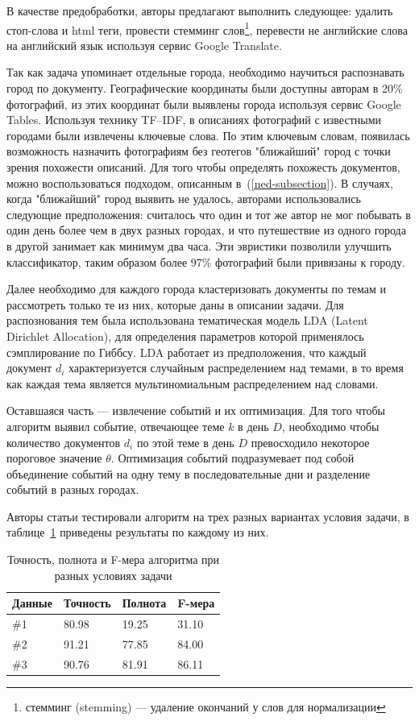 \documentclass[12pt, a4paper]{article}
\begin{document}
  В качестве предобработки, авторы предлагают выполнить следующее: удалить стоп-слова и html теги, провести стемминг слов\footnote{стемминг (stemming) --- удаление окончаний у слов для нормализации}, перевести не английские слова на английский язык используя сервис Google Translate.
  
	Так как задача упоминает отдельные города, необходимо научиться распознавать город по документу. Географические координаты были доступны авторам в 20\% фотографий, из этих координат были выявлены города используя сервис Google Tables. Используя технику TF--IDF, в описаниях фотографий с известными городами были извлечены ключевые слова. По этим ключевым словам, появилась возможность назначить фотографиям без геотегов "ближайший" город с точки зрения похожести описаний. Для того чтобы определять похожесть документов, можно воспользоваться подходом, описанным в~(\ref{ned-subsection}). В случаях, когда "ближайший" город выявить не удалось, авторами использовались следующие предположения: считалось что один и тот же автор не мог побывать в один день более чем в двух разных городах, и что путешествие из одного города в другой занимает как минимум два часа. Эти эвристики позволили улучшить классификатор, таким образом более 97\% фотографий были привязаны к городу.
	
	Далее необходимо для каждого города кластеризовать документы по темам и рассмотреть только те из них, которые даны в описании задачи. Для распознования тем была использована тематическая модель LDA (Latent Dirichlet Allocation)\cite{lda-model}, для определения параметров которой применялось сэмплирование по Гиббсу\cite{lda-gibbs}. LDA работает из предположения, что каждый документ $d_i$ характеризуется случайным распределением над темами, в то время как каждая тема является мультиномиальным распределением над словами.
	
	Оставшаяся часть --- извлечение событий и их оптимизация. Для того чтобы алгоритм выявил событие, отвечающее теме $k$ в день $D$, необходимо чтобы количество документов $d_i$ по этой теме в день $D$ превосходило некоторое пороговое значение $\theta$. Оптимизация событий подразумевает под собой объединение событий на одну тему в последовательные дни и разделение событий в разных городах.
	
	Авторы статьи тестировали алгоритм на трех разных вариантах условия задачи, в таблице~\ref{lda-table} приведены результаты по каждому из них.
	
\begin{table}[h]
	\centering
    \begin{tabular}{ | l | l | l | l | }
    \hline
    Данные & Точность & Полнота & F-мера \\ \hline
    \#1 & 80.98 & 19.25 & 31.10 \\ \hline
    \#2 & 91.21 & 77.85 & 84.00  \\ \hline
    \#3 & 90.76 & 81.91 & 86.11 \\ \hline
    \end{tabular}
    \caption{Точность, полнота и F-мера алгоритма при разных условиях задачи}
    \label{lda-table}
\end{table}
\end{document}
